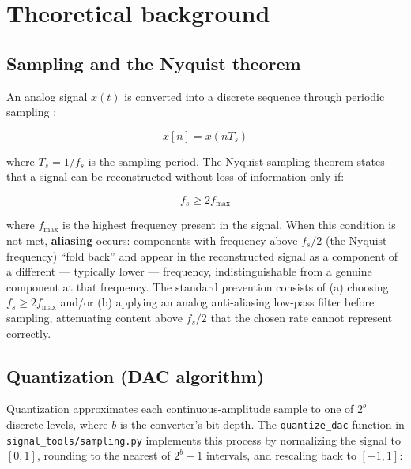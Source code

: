 
\section{Theoretical background}

\subsection{Sampling and the Nyquist theorem}
\label{sec:aliasing}

An analog signal $x(t)$ is converted into a discrete sequence through periodic sampling \cite{oppenheim}:

\begin{equation}
x[n] = x(nT_s)
\end{equation}

where $T_s = 1/f_s$ is the sampling period. The Nyquist sampling theorem states that a signal can be reconstructed without loss of information only if:

\begin{equation}
f_s \geq 2 f_{\max}
\end{equation}

where $f_{\max}$ is the highest frequency present in the signal. When this condition is not met, \textbf{aliasing} occurs: components with frequency above $f_s/2$ (the Nyquist frequency) ``fold back'' and appear in the reconstructed signal as a component of a different — typically lower — frequency, indistinguishable from a genuine component at that frequency. The standard prevention consists of (a) choosing $f_s \geq 2f_{\max}$ and/or (b) applying an analog anti-aliasing low-pass filter before sampling, attenuating content above $f_s/2$ that the chosen rate cannot represent correctly.

\subsection{Quantization (DAC algorithm)}

Quantization approximates each continuous-amplitude sample to one of $2^{b}$ discrete levels, where $b$ is the converter's bit depth. The \texttt{quantize\_dac} function in \texttt{signal\_tools/sampling.py} implements this process by normalizing the signal to $[0,1]$, rounding to the nearest of $2^b - 1$ intervals, and rescaling back to $[-1,1]$:

